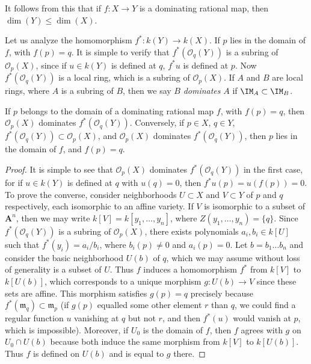 \begin{remark}
    It follows from this that if $f: X \to Y$ is a dominating rational map, then $\dim(Y) \leq \dim(X)$.
\end{remark}

Let us analyze the homomorphism $f^*: k(Y) \to k(X)$. If $p$ lies in the domain of $f$, with $f(p) = q$. It is simple to verify that $f^*(\mathcal{O}_q(Y))$ is a subring of $\mathcal{O}_p(X)$, since if $u \in k(Y)$ is defined at $q$, $f^*u$ is defined at $p$. Now $f^*(\mathcal{O}_q(Y))$ is a local ring, which is a subring of $\mathcal{O}_p(X)$. If $A$ and $B$ are local rings, where $A$ is a subring of $B$, then we say $B$ \emph{dominates} $A$ if $\IM_A \subset \IM_B$.

\begin{theorem}
    If $p$ belongs to the domain of a dominating rational map $f$, with $f(p) = q$, then $\mathcal{O}_p(X)$ dominates $f^*(\mathcal{O}_q(Y))$. Conversely, if $p \in X$, $q \in Y$, $f^*(\mathcal{O}_q(Y)) \subset \mathcal{O}_p(X)$, and $\mathcal{O}_p(X)$ dominates $f^*(\mathcal{O}_q(Y))$, then $p$ lies in the domain of $f$, and $f(p) = q$.
\end{theorem}
\begin{proof}
    It is simple to see that $\mathcal{O}_p(X)$ dominates $f^*(\mathcal{O}_q(Y))$ in the first case, for if $u \in k(Y)$ is defined at $q$ with $u(q) = 0$, then $f^*u(p) = u(f(p)) = 0$. To prove the converse, consider neighborhoods $U \subset X$ and $V \subset Y$ of $p$ and $q$ respectively, each isomorphic to an affine variety. If $V$ is isomorphic to a subset of $\mathbf{A}^n$, then we may write $k[V] = k[y_1,\dots,y_n]$, where $Z(y_1,\dots,y_n) = \{ q \}$. Since $f^*(\mathcal{O}_q(Y))$ is a subring of $\mathcal{O}_p(X)$, there exists polynomials $a_i,b_i \in k[U]$ such that $f^*(y_i) = a_i/b_i$, where $b_i(p) \neq 0$ and $a_i(p) = 0$. Let $b = b_1 \dots b_n$ and consider the basic neighborhood $U(b)$ of $q$, which we may assume without loss of generality is a subset of $U$. Thus $f$ induces a homomorphism $f^*$ from $k[V]$ to $k[U(b)]$, which corresponds to a unique morphism $g: U(b) \to V$ since these sets are affine. This morphism satisfies $g(p) = q$ precisely because $f^*(\mathfrak{m}_q) \subset \mathfrak{m}_p$ (if $g(p)$ equalled some other element $r$ than $q$, we could find a regular function $u$ vanishing at $q$ but not $r$, and then $f^*(u)$ would vanish at $p$, which is impossible). Moreover, if $U_0$ is the domain of $f$, then $f$ agrees with $g$ on $U_0 \cap U(b)$ because both induce the same morphism from $k[V]$ to $k[U(b)]$. Thus $f$ is defined on $U(b)$ and is equal to $g$ there.
\end{proof}

